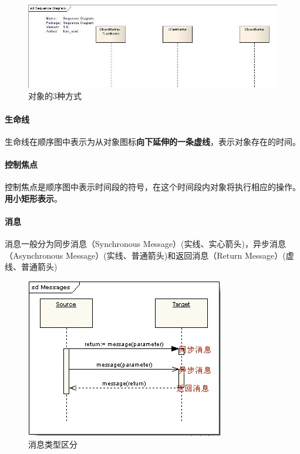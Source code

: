 \documentclass[UTF8,a4paper,12pt]{ctexbook}
\begin{document}
			\begin{figure}[H]
				\centering
				\includegraphics[scale=1]{SequenceDiagram-Object}
				\caption{对象的3种方式}
			\end{figure}
			
			
		\paragraph{生命线}
			生命线在顺序图中表示为从对象图标\textbf{向下延伸的一条虚线}，表示对象存在的时间。
		
		\paragraph{控制焦点}
			控制焦点是顺序图中表示时间段的符号，在这个时间段内对象将执行相应的操作。\textbf{用小矩形表示}。
		
		\paragraph{消息}
			消息一般分为同步消息（Synchronous Message）(实线、实心箭头)，异步消息（Asynchronous Message）(实线、普通箭头)和返回消息（Return Message）(虚线、普通箭头)
			
			\begin{figure}[H]
				\centering
				\includegraphics{Message}
				\caption{消息类型区分}
			\end{figure}
			
\end{document}
